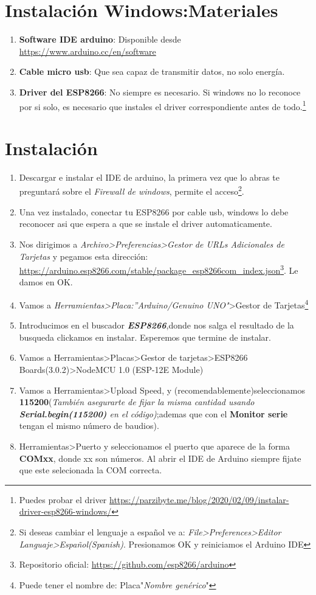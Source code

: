 \documentclass[
	12pt, %
	fleqn, %
	a4paper, %
]{LegrandOrangeBook}
\begin{document}
\section{Instalación Windows:Materiales}
\begin{enumerate}
\item \textbf{Software IDE arduino}: Disponible desde \url{https://www.arduino.cc/en/software}
\item \textbf{Cable micro usb}: Que sea capaz de transmitir datos, no solo energía.
\item \textbf{Driver del ESP8266}: No siempre es necesario. Si windows no lo reconoce por si solo, es necesario que instales el driver correspondiente antes de todo.\footnote{Puedes probar el driver \url{https://parzibyte.me/blog/2020/02/09/instalar-driver-esp8266-windows/} }
\end{enumerate}
\section{Instalación}
\begin{enumerate}
\item Descargar e instalar el IDE de arduino, la primera vez que lo abras te preguntará sobre el \textit{Firewall de windows}, permite el acceso\footnote{Si deseas cambiar el lenguaje a español ve a: \textit{File>Preferences>Editor Languaje>Español(Spanish)}. Presionamos OK y reiniciamos el Arduino IDE}.
\item Una vez instalado, conectar tu ESP8266 por cable usb, windows lo debe reconocer asi que espera a que se instale el driver automaticamente.
\item Nos dirigimos a \textit{Archivo>Preferencias>Gestor de URLs Adicionales de Tarjetas} y pegamos esta dirección: \url{https://arduino.esp8266.com/stable/package_esp8266com_index.json}\footnote{Repositorio oficial: \url{https://github.com/esp8266/arduino}}. Le damos en OK.
\item Vamos a \textit{Herramientas>Placa:''Arduino/Genuino UNO"}>Gestor de Tarjetas\footnote{Puede tener el nombre de: Placa"\textit{Nombre genérico}"}
\item Introducimos en el buscador \textbf{\textit{ESP8266}},donde nos salga el resultado de la busqueda clickamos en instalar. Esperemos que termine de instalar.
\item Vamos a Herramientas>Placas>Gestor de tarjetas>ESP8266 Boards(3.0.2)>NodeMCU 1.0 (ESP-12E Module)
\item Vamos a Herramientas>Upload Speed, y (recomendablemente)seleccionamos \textbf{115200}(\textit{También asegurarte de fijar la misma cantidad usando \textbf{Serial.begin(115200)}  en el código)};ademas que con el \textbf{Monitor serie} tengan el mismo número de baudios).
\item Herramientas>Puerto y seleccionamos el puerto que aparece de la forma \textbf{COMxx}, donde xx son números. Al abrir el IDE de Arduino siempre fijate que este selecionada la COM correcta.
\end{enumerate}
\end{document}
